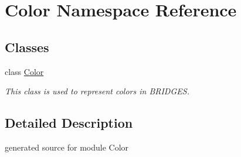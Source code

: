 \hypertarget{namespace_color}{}\section{Color Namespace Reference}
\label{namespace_color}
\subsection*{Classes}
\begin{DoxyCompactItemize}
\item 
class \hyperlink{class_color_1_1_color}{Color}
\begin{DoxyCompactList}\small\item\em This class is used to represent colors in B\+R\+I\+D\+G\+ES. \end{DoxyCompactList}\end{DoxyCompactItemize}


\subsection{Detailed Description}
\begin{DoxyVerb}generated source for module Color \end{DoxyVerb}
 